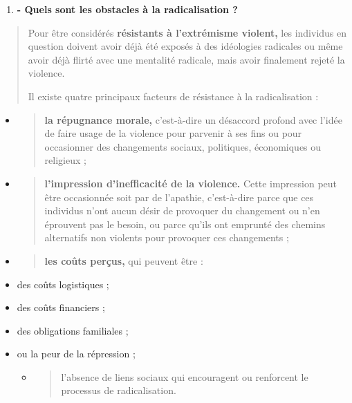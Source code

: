\begin{enumerate}
\def\labelenumi{\arabic{enumi}.}
\setcounter{enumi}{4}
\item
  \textbf{- Quels sont les obstacles à la radicalisation ?}
\end{enumerate}

\begin{quote}
Pour être considérés \textbf{résistants à l'extrémisme violent,} les
individus en question doivent avoir déjà été exposés à des idéologies
radicales ou même avoir déjà flirté avec une mentalité radicale, mais
avoir finalement rejeté la violence.

Il existe quatre principaux facteurs de résistance à la radicalisation :
\end{quote}

\begin{itemize}
\item
  \begin{quote}
  \textbf{la répugnance morale,} c'est-à-dire un désaccord profond avec
  l'idée de faire usage de la violence pour parvenir à ses fins ou pour
  occasionner des changements sociaux, politiques, économiques ou
  religieux ;
  \end{quote}
\item
  \begin{quote}
  \textbf{l'impression d'inefficacité de la violence.} Cette impression
  peut être occasionnée soit par de l'apathie, c'est-à-dire parce que
  ces individus n'ont aucun désir de provoquer du changement ou n'en
  éprouvent pas le besoin, ou parce qu'ils ont emprunté des chemins
  alternatifs non violents pour provoquer ces changements ;
  \end{quote}
\item
  \begin{quote}
  \textbf{les coûts perçus,} qui peuvent être :
  \end{quote}
\end{itemize}

\begin{itemize}
\item
  des coûts logistiques ;
\item
  des coûts financiers ;
\item
  des obligations familiales ;
\item
  ou la peur de la répression ;

  \begin{itemize}
  \item
    \begin{quote}
    l'absence de liens sociaux qui encouragent ou renforcent le
    processus de radicalisation.
    \end{quote}
  \end{itemize}
\end{itemize}

